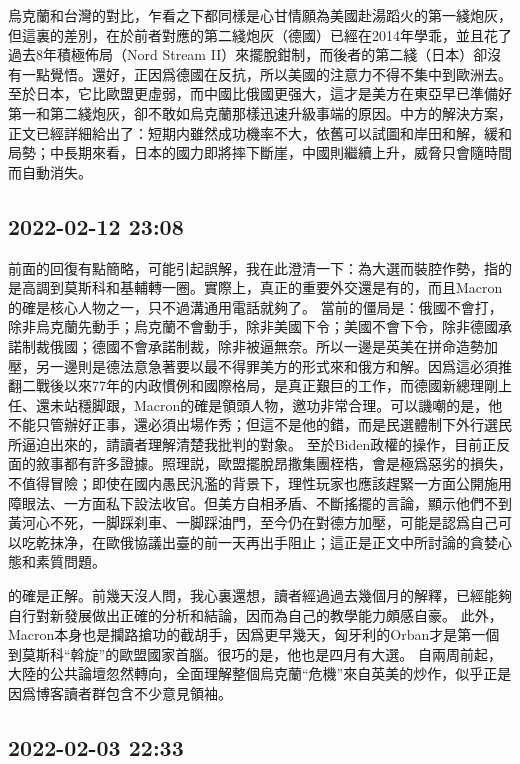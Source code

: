 \documentclass[twocolumn]{ctexart}
\begin{document}
烏克蘭和台灣的對比，乍看之下都同樣是心甘情願為美國赴湯蹈火的第一綫炮灰，但這裏的差別，在於前者對應的第二綫炮灰（德國）已經在2014年學乖，並且花了過去8年積極佈局（Nord Stream II）來擺脫鉗制，而後者的第二綫（日本）卻沒有一點覺悟。還好，正因爲德國在反抗，所以美國的注意力不得不集中到歐洲去。至於日本，它比歐盟更虛弱，而中國比俄國更强大，這才是美方在東亞早已準備好第一和第二綫炮灰，卻不敢如烏克蘭那樣迅速升級事端的原因。中方的解決方案，正文已經詳細給出了：短期内雖然成功機率不大，依舊可以試圖和岸田和解，緩和局勢；中長期來看，日本的國力即將摔下斷崖，中國則繼續上升，威脅只會隨時間而自動消失。
\subsection*{2022-02-12 23:08}

前面的回復有點簡略，可能引起誤解，我在此澄清一下：為大選而裝腔作勢，指的是高調到莫斯科和基輔轉一圈。實際上，真正的重要外交還是有的，而且Macron的確是核心人物之一，只不過溝通用電話就夠了。
當前的僵局是：俄國不會打，除非烏克蘭先動手；烏克蘭不會動手，除非美國下令；美國不會下令，除非德國承諾制裁俄國；德國不會承諾制裁，除非被逼無奈。所以一邊是英美在拼命造勢加壓，另一邊則是德法意急著要以最不得罪美方的形式來和俄方和解。因爲這必須推翻二戰後以來77年的内政慣例和國際格局，是真正艱巨的工作，而德國新總理剛上任、還未站穩脚跟，Macron的確是領頭人物，邀功非常合理。可以譏嘲的是，他不能只管辦好正事，還必須出場作秀；但這不是他的錯，而是民選體制下外行選民所逼迫出來的，請讀者理解清楚我批判的對象。
至於Biden政權的操作，目前正反面的敘事都有許多證據。照理説，歐盟擺脫昂撒集團桎梏，會是極爲惡劣的損失，不值得冒險；即使在國内愚民汎濫的背景下，理性玩家也應該趕緊一方面公開施用障眼法、一方面私下設法收官。但美方自相矛盾、不斷搖擺的言論，顯示他們不到黃河心不死，一脚踩刹車、一脚踩油門，至今仍在對德方加壓，可能是認爲自己可以吃乾抹净，在歐俄協議出臺的前一天再出手阻止；這正是正文中所討論的貪婪心態和素質問題。

的確是正解。前幾天沒人問，我心裏還想，讀者經過過去幾個月的解釋，已經能夠自行對新發展做出正確的分析和結論，因而為自己的教學能力頗感自豪。
此外，Macron本身也是攔路搶功的截胡手，因爲更早幾天，匈牙利的Orban才是第一個到莫斯科“斡旋”的歐盟國家首腦。很巧的是，他也是四月有大選。
自兩周前起，大陸的公共論壇忽然轉向，全面理解整個烏克蘭“危機”來自英美的炒作，似乎正是因爲博客讀者群包含不少意見領袖。
\subsection*{2022-02-03 22:33}
\end{document}
